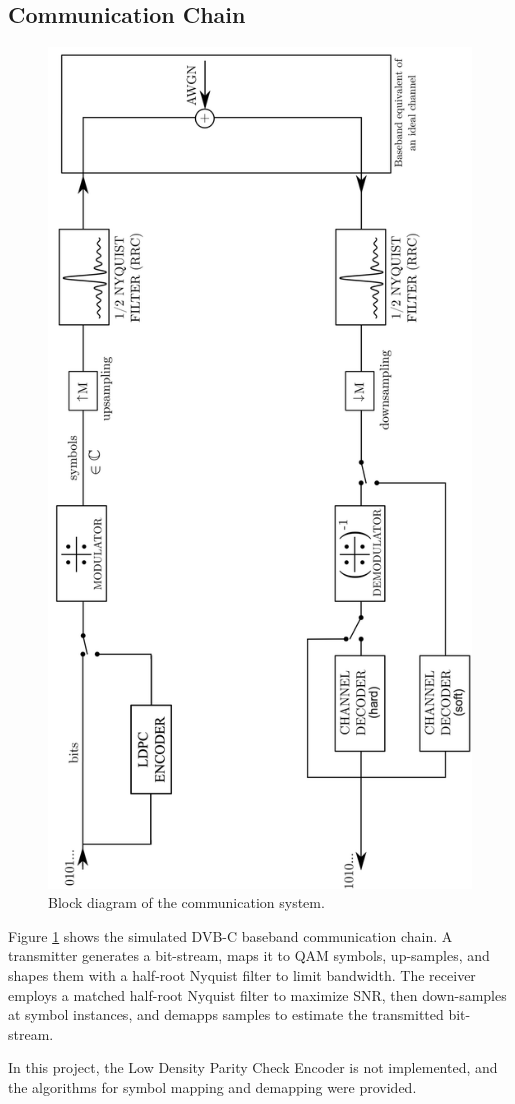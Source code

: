 \documentclass[11pt]{article}
\begin{document}
	\subsection{Communication Chain}
	\begin{figure}[H]
		\centering
		\includegraphics[angle=-90, width=0.7\linewidth]{Images/com-chain}
		\caption{Block diagram of the communication system.}
		\label{fig:com-chain}
	\end{figure}
	Figure \ref{fig:com-chain} shows the simulated DVB-C baseband communication chain. A transmitter generates a bit-stream, maps it to QAM symbols, up-samples, and shapes them with a half-root Nyquist filter to limit bandwidth. The receiver employs a matched half-root Nyquist filter to maximize SNR, then down-samples at symbol instances, and demapps samples to estimate the transmitted bit-stream.
	\par
	In this project, the Low Density Parity Check Encoder is not implemented, and the algorithms for symbol mapping and demapping were provided.
	
\end{document}
